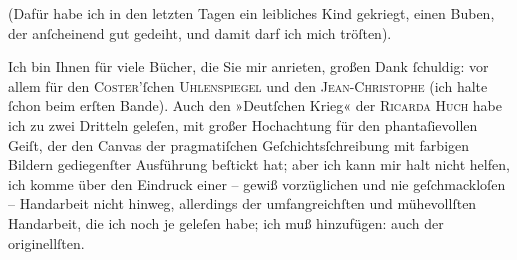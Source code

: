 \pstart
           (Dafür habe ich in den letzten Tagen ein leibliches Kind gekriegt, einen Buben, der anſcheinend gut gedeiht,
               und damit darf ich mich tröſten).\pend
           
\pstart
           Ich bin Ihnen für viele Bücher, die Sie mir anrieten, großen Dank{ }ſchuldig: vor allem
               für den \textsc{Coster}’ſchen \textsc{Uhlenspiegel} und den \textsc{Jean-Christophe} (ich halte{ }ſchon beim erſten Bande). Auch den »Deutſchen Krieg« der \textsc{Ricarda Huch} habe ich zu zwei Dritteln geleſen, mit großer Hochachtung für den
               phantaſievollen Geiſt, der den Canvas der pragmatiſchen Geſchichtsſchreibung mit {\pb}farbigen Bildern gediegenſter Ausführung beſtickt hat;
               aber ich kann mir halt nicht helfen, ich komme über den Eindruck einer – gewiß
               vorzüglichen und nie geſchmackloſen – Handarbeit nicht  hinweg, allerdings der umfangreichſten und mühevollſten Handarbeit,
               die ich noch je geleſen habe; ich muß hinzufügen: auch der originellſten.\pend
           

